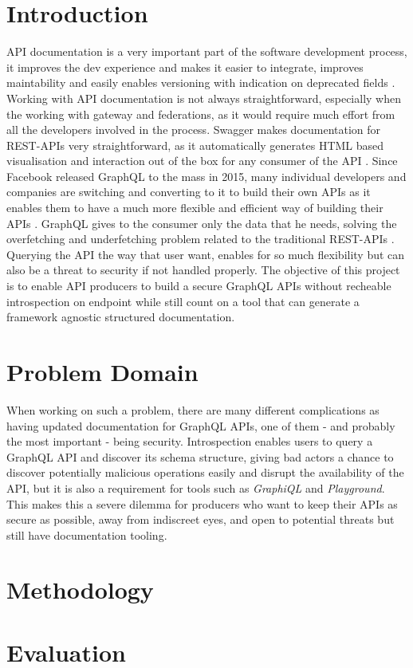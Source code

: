 \section*{Introduction}
\label{s:Introduction}
API documentation is a very important part of the software development process,
it improves the dev experience and makes it easier to integrate, improves
maintability and easily enables versioning with indication on deprecated fields
\citep{fanWhyAPIDocumentation2021}. Working with API documentation is not always
straightforward, especially when the working with gateway and federations, as it
would require much effort from all the developers involved in the process.
Swagger makes documentation for REST-APIs very straightforward, as it
automatically generates HTML based visualisation and interaction out of the box
for any consumer of the API \citep{korenExploitationOpenAPIDocumentation2018}.
Since Facebook released GraphQL to the mass in 2015, many individual developers
and companies are switching and converting to it to build their own APIs as it
enables them to have a much more flexible and efficient way of building their
APIs \citep{britoRESTVsGraphQL2020}. GraphQL gives to the consumer only the data
that he needs, solving the overfetching and underfetching problem related to the
traditional REST-APIs \citep{witternGeneratingGraphQLWrappersREST2018}. Querying
the API the way that user want, enables for so much flexibility but can also be
a threat to security if not handled properly. The objective of this project is
to enable API producers to build a secure GraphQL APIs without recheable
introspection on endpoint while still count on a tool that can generate a
framework agnostic structured documentation.

\section*{Problem Domain}
\label{s:Problem-Domain}
When working on such a problem, there are many different complications as having
updated documentation for GraphQL APIs, one of them - and probably the most
important - being security. Introspection enables users to query a GraphQL API
and discover its schema structure, giving bad actors a chance to discover
potentially malicious operations \citep{khalilWhyYouShould2021} easily and
disrupt the availability of the API, but it is also a requirement for tools such
as \textit{GraphiQL} and \textit{Playground}. This makes this a severe dilemma
for producers who want to keep their APIs as secure as possible, away from
indiscreet eyes, and open to potential threats but still have documentation
tooling.

\section*{Methodology}
\label{s:Methodology}

\section*{Evaluation}
\label{s:Evaluation}
